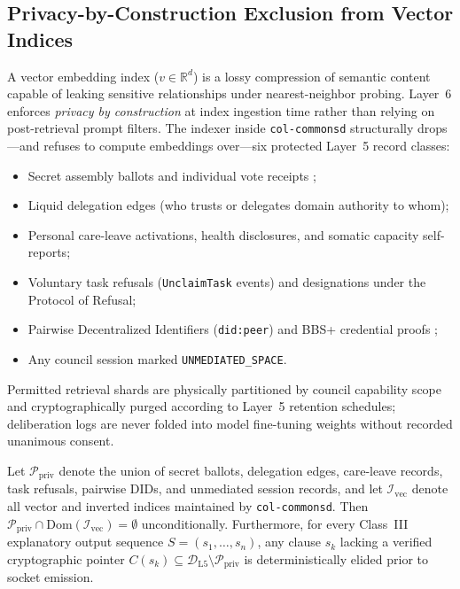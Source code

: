 \subsection{Privacy-by-Construction Exclusion from Vector Indices}
\label{subsec:privacy-scoped-rag}

A vector embedding index ($v \in \mathbb{R}^{d}$) is a lossy compression of semantic content capable of leaking sensitive relationships under nearest-neighbor probing. Layer~6 enforces \emph{privacy by construction} at index ingestion time rather than relying on post-retrieval prompt filters. The indexer inside \texttt{col-commonsd} structurally drops---and refuses to compute embeddings over---six protected Layer~5 record classes:
\begin{itemize}
  \item Secret assembly ballots and individual vote receipts \parencite{adida2008helios,juels2005coercion};
  \item Liquid delegation edges (who trusts or delegates domain authority to whom);
  \item Personal care-leave activations, health disclosures, and somatic capacity self-reports;
  \item Voluntary task refusals (\texttt{UnclaimTask} events) and designations under the Protocol of Refusal;
  \item Pairwise Decentralized Identifiers (\texttt{did:peer}) and BBS+ credential proofs \parencite{camenisch2004signature,w3c2022did};
  \item Any council session marked \texttt{UNMEDIATED\_SPACE}.
\end{itemize}
Permitted retrieval shards are physically partitioned by council capability scope and cryptographically purged according to Layer~5 retention schedules; deliberation logs are never folded into model fine-tuning weights without recorded unanimous consent.

\begin{invariant}
\label{inv:rag-privacy-citation}
Let $\mathcal{P}_{\mathrm{priv}}$ denote the union of secret ballots, delegation edges, care-leave records, task refusals, pairwise DIDs, and unmediated session records, and let $\mathcal{I}_{\mathrm{vec}}$ denote all vector and inverted indices maintained by \texttt{col-commonsd}. Then $\mathcal{P}_{\mathrm{priv}} \cap \mathrm{Dom}(\mathcal{I}_{\mathrm{vec}}) = \emptyset$ unconditionally. Furthermore, for every Class~III explanatory output sequence $S = (s_1, \dots, s_n)$, any clause $s_k$ lacking a verified cryptographic pointer $C(s_k) \subseteq \mathcal{D}_{\mathrm{L5}} \setminus \mathcal{P}_{\mathrm{priv}}$ is deterministically elided prior to socket emission.
\end{invariant}

